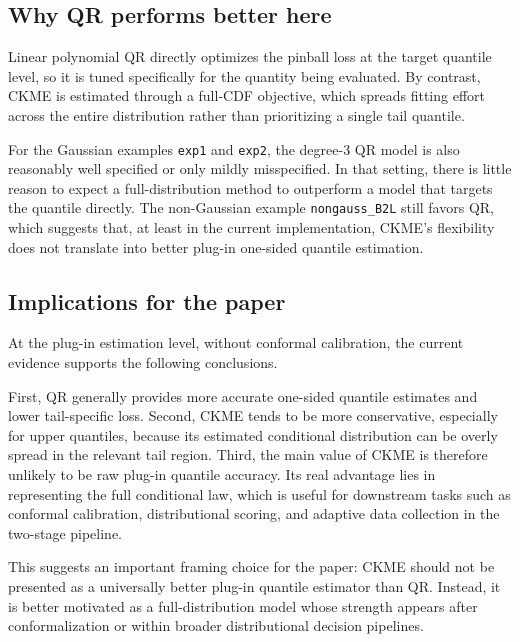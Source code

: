 \documentclass[11pt]{article}
\begin{document}
	\subsection{Why QR performs better here}
	
	Linear polynomial QR directly optimizes the pinball loss at the target quantile level,
	so it is tuned specifically for the quantity being evaluated. By contrast, CKME is
	estimated through a full-CDF objective, which spreads fitting effort across the
	entire distribution rather than prioritizing a single tail quantile.
	
	For the Gaussian examples \texttt{exp1} and \texttt{exp2}, the degree-3 QR model is
	also reasonably well specified or only mildly misspecified. In that setting, there is
	little reason to expect a full-distribution method to outperform a model that targets
	the quantile directly. The non-Gaussian example \texttt{nongauss\_B2L} still favors
	QR, which suggests that, at least in the current implementation, CKME's flexibility
	does not translate into better plug-in one-sided quantile estimation.
	
	\subsection{Implications for the paper}
	
	At the plug-in estimation level, without conformal calibration, the current evidence
	supports the following conclusions.
	
	First, QR generally provides more accurate one-sided quantile estimates and lower
	tail-specific loss. Second, CKME tends to be more conservative, especially for upper
	quantiles, because its estimated conditional distribution can be overly spread in the
	relevant tail region. Third, the main value of CKME is therefore unlikely to be raw
	plug-in quantile accuracy. Its real advantage lies in representing the full
	conditional law, which is useful for downstream tasks such as conformal calibration,
	distributional scoring, and adaptive data collection in the two-stage pipeline.
	
	This suggests an important framing choice for the paper: CKME should not be presented
	as a universally better plug-in quantile estimator than QR. Instead, it is better
	motivated as a full-distribution model whose strength appears after conformalization
	or within broader distributional decision pipelines.
	
\end{document}
